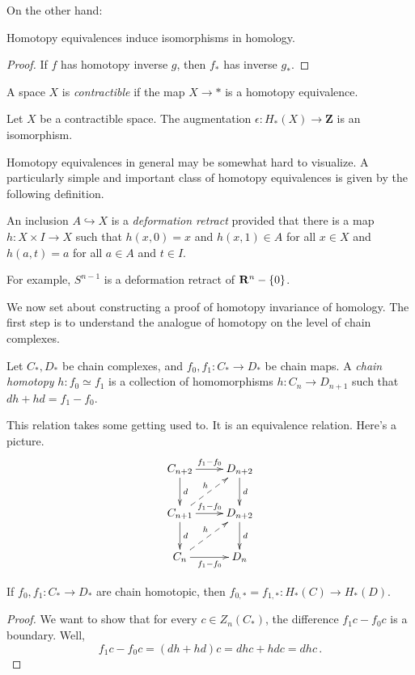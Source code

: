 On the other hand:
\begin{corollary}
Homotopy equivalences induce isomorphisms in homology.
\end{corollary}
\begin{proof} 
If $f$ has homotopy inverse $g$, then $f_*$ has inverse $g_*$.
\end{proof}
\begin{definition}
A space $X$ is {\em contractible} if the map $X\to\ast$ is a homotopy equivalence.
\end{definition}
\begin{corollary}
Let $X$ be a contractible space. The augmentation $\epsilon:H_*(X)\to\mathbf{Z}$ is an isomorphism. 
\end{corollary}

Homotopy equivalences in general may be somewhat hard to visualize. 
A particularly simple and important class of homotopy equivalences is 
given by the following definition. 
\begin{definition}
An inclusion $A\hookrightarrow X$ is a {\em deformation retract} 
provided that there is a map $h:X\times I\to X$ such that 
$h(x,0)=x$ and $h(x,1)\in A$ for all $x\in X$ and $h(a,t)=a$ for all
$a\in A$ and $t\in I$. 
\end{definition}

For example, $S^{n-1}$ is a deformation retract of $\mathbf R^n-\{0\}$.

\bigskip
We now set about constructing a proof of homotopy invariance of homology. 
The first step is to understand the analogue of homotopy on the level of
chain complexes. 
	\begin{definition}
	Let $C_\ast,D_\ast$ be chain complexes, and $f_0,f_1:C_\ast\to D_\ast$ be chain maps. A {\em chain homotopy} $h:f_0\simeq f_1$ is a collection of homomorphisms $h:C_n\to D_{n+1}$ such that $dh+hd=f_1-f_0$.
	\end{definition}
This relation takes some getting used to. It is an equivalence relation.
Here's a picture. 
			\begin{equation*}
			\xymatrix{C_{n+2}\ar[r]^{f_1-f_0}\ar[d]^d & D_{n+2}\ar[d]^d\\
			C_{n+1}\ar@{-->}[ur]^h\ar[r]^{f_1-f_0}\ar[d]^d & D_{n+2}\ar[d]^d\\
			C_n\ar@{-->}[ur]^h\ar[r]_{f_1-f_0} & D_n}
			\end{equation*}

	\begin{lemma}
	If $f_0,f_1:C_\ast\to D_\ast$ are chain homotopic, then $f_{0,\ast}=f_{1,\ast}: H_\ast(C)\to H_\ast(D)$.
	\end{lemma}
		\begin{proof}
We want to show that for every $c\in Z_n(C_\ast)$, the difference 
$f_1c-f_0c$ is a boundary. Well, 
\[
f_1c-f_0c=(d h+hd)c=d hc+hd c=dhc\,.
\]
		\end{proof}

